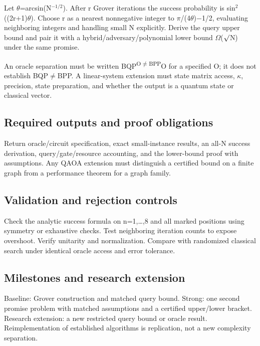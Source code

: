 \documentclass[
  11pt,
]{article}
\begin{document}
Let \ensuremath{\theta}=arcsin(N\ensuremath{{}^{-1/2}}). After r Grover
iterations the success probability is
sin\ensuremath{{}^{2}}((2r+1)\ensuremath{\theta}). Choose r as a nearest
nonnegative integer to
\ensuremath{\pi}/(4\ensuremath{\theta})\ensuremath{-}1/2, evaluating
neighboring integers and handling small N explicitly. Derive the query
upper bound and pair it with a hybrid/adversary/polynomial lower bound
\ensuremath{\Omega}(\ensuremath{\surd}N) under the same promise.

An oracle separation must be written
BQP\textsuperscript{O\ensuremath{\ne}BPP}O for a specified O; it does
not establish BQP\ensuremath{\ne}BPP. A linear-system extension must
state matrix access, \ensuremath{\kappa}, precision, state preparation,
and whether the output is a quantum state or classical vector.

\subsection{Required outputs and proof obligations}

Return oracle/circuit specification, exact small-instance results, an
all-N success derivation, query/gate/resource accounting, and the
lower-bound proof with assumptions. Any QAOA extension must distinguish
a certified bound on a finite graph from a performance theorem for a
graph family.

\subsection{Validation and rejection controls}

Check the analytic success formula on n=1,\ldots,8 and all marked
positions using symmetry or exhaustive checks. Test neighboring
iteration counts to expose overshoot. Verify unitarity and
normalization. Compare with randomized classical search under identical
oracle access and error tolerance.

\subsection{Milestones and research extension}

Baseline: Grover construction and matched query bound. Strong: one
second promise problem with matched assumptions and a certified
upper/lower bracket. Research extension: a new restricted query bound or
oracle result. Reimplementation of established algorithms is
replication, not a new complexity separation.
\end{document}
